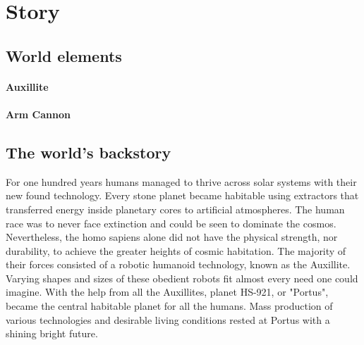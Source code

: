 \documentclass[../Main.tex]{subfiles}
\begin{document}
\section{Story}


\subsection{World elements}

\paragraph{Auxillite} 

\paragraph{Arm Cannon}

\subsection{The world's backstory}

For one hundred years humans managed to thrive across solar systems with their new found technology. Every stone planet became habitable using extractors that transferred energy inside planetary cores to artificial atmospheres. The human race was to never face extinction and could be seen to dominate the cosmos. Nevertheless, the homo sapiens alone did not have the physical strength, nor durability, to achieve the greater heights of cosmic habitation. The majority of their forces consisted of a robotic humanoid technology, known as the Auxillite. Varying shapes and sizes of these obedient robots fit almost every need one could imagine. With the help from all the Auxillites, planet HS-921, or "Portus", became the central habitable planet for all the humans. Mass production of various technologies and desirable living conditions rested at Portus with a shining bright future. 
\end{document}
